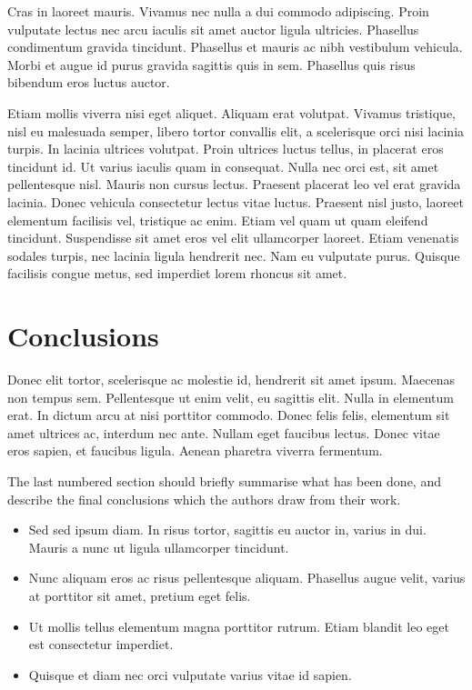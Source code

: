 \documentclass[a4paper,fleqn,usenatbib]{mnras}
\begin{document}
Cras in laoreet mauris. Vivamus nec nulla a dui commodo adipiscing. Proin vulputate lectus nec arcu iaculis sit amet auctor ligula ultricies. Phasellus condimentum gravida tincidunt. Phasellus et mauris ac nibh vestibulum vehicula. Morbi et augue id purus gravida sagittis quis in sem. Phasellus quis risus bibendum eros luctus auctor.

Etiam mollis viverra nisi eget aliquet. Aliquam erat volutpat. Vivamus tristique, nisl eu malesuada semper, libero tortor convallis elit, a scelerisque orci nisi lacinia turpis. In lacinia ultrices volutpat. Proin ultrices luctus tellus, in placerat eros tincidunt id. Ut varius iaculis quam in consequat. Nulla nec orci est, sit amet pellentesque nisl. Mauris non cursus lectus. Praesent placerat leo vel erat gravida lacinia. Donec vehicula consectetur lectus vitae luctus. Praesent nisl justo, laoreet elementum facilisis vel, tristique ac enim. Etiam vel quam ut quam eleifend tincidunt. Suspendisse sit amet eros vel elit ullamcorper laoreet. Etiam venenatis sodales turpis, nec lacinia ligula hendrerit nec. Nam eu vulputate purus. Quisque facilisis congue metus, sed imperdiet lorem rhoncus sit amet.


\section{Conclusions}\label{sec:conclusions} 
Donec elit tortor, scelerisque ac molestie id, hendrerit sit amet ipsum. Maecenas non tempus sem. Pellentesque ut enim velit, eu sagittis elit. Nulla in elementum erat. In dictum arcu at nisi porttitor commodo. Donec felis felis, elementum sit amet ultrices ac, interdum nec ante. Nullam eget faucibus lectus. Donec vitae eros sapien, et faucibus ligula. Aenean pharetra viverra fermentum.

The last numbered section should briefly summarise what has been done, and describe
the final conclusions which the authors draw from their work.

\begin{itemize}
  \item Sed sed ipsum diam. In risus tortor, sagittis eu auctor in, varius in dui. Mauris a nunc ut ligula ullamcorper tincidunt. 
  \item Nunc aliquam eros ac risus pellentesque aliquam. Phasellus augue velit, varius at porttitor sit amet, pretium eget felis. 
  \item Ut mollis tellus elementum magna porttitor rutrum. Etiam blandit leo eget est consectetur imperdiet. 
 \item Quisque et diam nec orci vulputate varius vitae id sapien.
\end{itemize}
\end{document}
